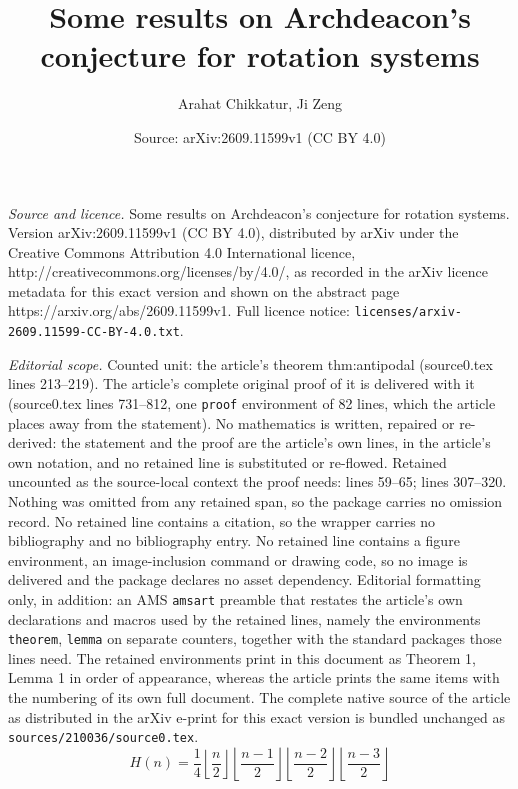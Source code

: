 \documentclass[10pt,a4paper]{amsart}
\title{Some results on Archdeacon's conjecture for rotation systems}
\author{Arahat Chikkatur, Ji Zeng}
\date{Source: arXiv:2609.11599v1 (CC BY 4.0)}
\begin{document}
\maketitle

\noindent\emph{Source and licence.} Some results on Archdeacon's conjecture for rotation systems. Version arXiv:2609.11599v1 (CC BY 4.0), distributed by arXiv under the Creative Commons Attribution 4.0 International licence, http://creativecommons.org/licenses/by/4.0/, as recorded in the arXiv licence metadata for this exact version and shown on the abstract page https://arxiv.org/abs/2609.11599v1. Full licence notice: \texttt{licenses/arxiv-2609.11599-CC-BY-4.0.txt}.\par\smallskip

\noindent\textit{Editorial scope.} Counted unit: the article's theorem thm:antipodal (source0.tex lines 213--219). The article's complete original proof of it is delivered with it (source0.tex lines 731--812, one \texttt{proof} environment of 82 lines, which the article places away from the statement). No mathematics is written, repaired or re-derived: the statement and the proof are the article's own lines, in the article's own notation, and no retained line is substituted or re-flowed.  Retained uncounted as the source-local context the proof needs: lines 59--65; lines 307--320.  Nothing was omitted from any retained span, so the package carries no omission record.  No retained line contains a citation, so the wrapper carries no bibliography and no bibliography entry.  No retained line contains a figure environment, an image-inclusion command or drawing code, so no image is delivered and the package declares no asset dependency.  Editorial formatting only, in addition: an AMS \texttt{amsart} preamble that restates the article's own declarations and macros used by the retained lines, namely the environments \texttt{theorem}, \texttt{lemma} on separate counters, together with the standard packages those lines need.  The retained environments print in this document as Theorem 1, Lemma 1 in order of appearance, whereas the article prints the same items with the numbering of its own full document.  The complete native source of the article as distributed in the arXiv e-print for this exact version is bundled unchanged as \texttt{sources/210036/source0.tex}.
\begin{equation}\label{eq:hill-number}
H(n)=\frac14
\left\lfloor\frac n2\right\rfloor
\left\lfloor\frac{n-1}2\right\rfloor
\left\lfloor\frac{n-2}2\right\rfloor
\left\lfloor\frac{n-3}2\right\rfloor
\end{equation}
\end{document}
